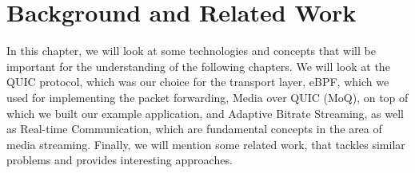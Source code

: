 
\chapter{Background and Related Work}\label{chap:background}

In this chapter, we will look at some technologies and concepts 
that will be important for the understanding of the following chapters.
We will look at the QUIC protocol, which was our choice for the transport layer, eBPF, which we used for implementing the packet 
forwarding, Media over QUIC (MoQ), on top of which we built 
our example application, and Adaptive Bitrate Streaming, as well as Real-time Communication, which are fundamental concepts in the area 
of media streaming.
Finally, we will mention some related work, that tackles similar 
problems and provides interesting approaches.  






